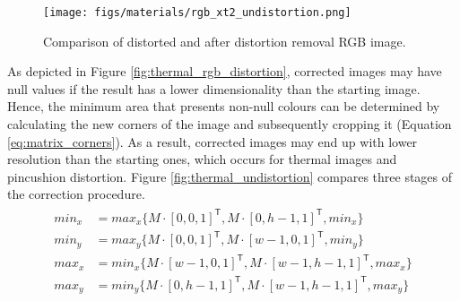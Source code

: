 \begin{figure}[!ht]
	\centering
	\texttt{[image: figs/materials/rgb\_xt2\_undistortion.png]}
	\caption{Comparison of distorted and after distortion removal RGB image.}
	\label{fig:rgb_xt2_undistortion}
\end{figure}

As depicted in Figure \ref{fig:thermal_rgb_distortion}, corrected images may have null values if the result has a lower dimensionality than the starting image. Hence, the minimum area that presents non-null colours can be determined by calculating the new corners of the image and subsequently cropping it (Equation \ref{eq:matrix_corners}). As a result, corrected images may end up with lower resolution than the starting ones, which occurs for thermal images and pincushion distortion. Figure \ref{fig:thermal_undistortion} compares three stages of the correction procedure. 
\begin{gather}
    \begin{aligned}
    \label{eq:matrix_corners}
    \textit{min}_x &= \textit{max}_x \{M \cdot [0, 0, 1]^\mathsf{T}, M \cdot [0, h - 1, 1]^\mathsf{T}, \textit{min}_x\}\\
    \textit{min}_y &= max_y\{M \cdot [0, 0, 1]^\mathsf{T}, M \cdot [w - 1, 0, 1]^\mathsf{T}, \textit{min}_y\}\\
    \textit{max}_x &= min_x\{M \cdot [w - 1, 0, 1]^\mathsf{T}, M \cdot [w - 1, h - 1, 1]^\mathsf{T}, \textit{max}_x\}\\
    \textit{max}_y &= \textit{min}_y\{M \cdot [0, h - 1, 1]^\mathsf{T}, M \cdot [w - 1, h - 1, 1]^\mathsf{T}, \textit{max}_y\}\\
    \end{aligned}
\end{gather}

